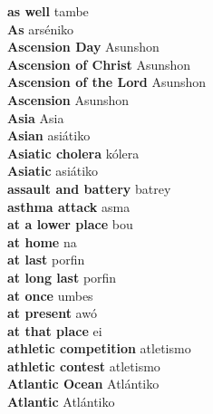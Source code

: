 \textbf{ as well  } tambe \\
\textbf{ As  } arséniko \\
\textbf{ Ascension Day  } Asunshon \\
\textbf{ Ascension of Christ  } Asunshon \\
\textbf{ Ascension of the Lord  } Asunshon \\
\textbf{ Ascension  } Asunshon \\
\textbf{ Asia  } Asia \\
\textbf{ Asian  } asiátiko \\
\textbf{ Asiatic cholera  } kólera \\
\textbf{ Asiatic  } asiátiko \\
\textbf{ assault and battery  } batrey \\
\textbf{ asthma attack  } asma \\
\textbf{ at a lower place  } bou \\
\textbf{ at home  } na \\
\textbf{ at last  } porfin \\
\textbf{ at long last  } porfin \\
\textbf{ at once  } umbes \\
\textbf{ at present  } awó \\
\textbf{ at that place  } ei \\
\textbf{ athletic competition  } atletismo \\
\textbf{ athletic contest  } atletismo \\
\textbf{ Atlantic Ocean  } Atlántiko \\
\textbf{ Atlantic  } Atlántiko \\
